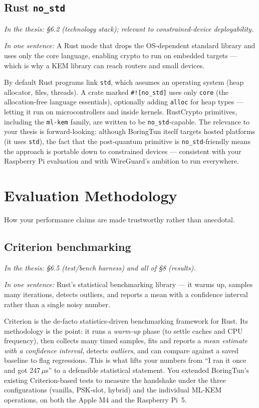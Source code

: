 \documentclass[11pt]{article}
\newcommand{\seethesis}[1]{%
  {\small\color{softgray}\textit{In the thesis: #1}}\par\vspace{3pt}}
\newcommand{\nutshell}[1]{\noindent\textit{In one sentence:} #1\par\vspace{4pt}}
\begin{document}
\subsection{Rust \texttt{no\_std}}
\seethesis{\S6.2 (technology stack); relevant to constrained-device deployability.}
\nutshell{A Rust mode that drops the OS-dependent standard library and uses only
the core language, enabling crypto to run on embedded targets --- which is why a
KEM library can reach routers and small devices.}

By default Rust programs link \texttt{std}, which assumes an operating system
(heap allocator, files, threads). A crate marked \texttt{\#![no\_std]} uses only
\texttt{core} (the allocation-free language essentials), optionally adding
\texttt{alloc} for heap types --- letting it run on microcontrollers and inside
kernels. RustCrypto primitives, including the \texttt{ml-kem} family, are written
to be \texttt{no\_std}-capable. The relevance to your thesis is forward-looking:
although BoringTun itself targets hosted platforms (it uses \texttt{std}), the
fact that the post-quantum primitive is \texttt{no\_std}-friendly means the
approach is portable down to constrained devices --- consistent with your
Raspberry Pi evaluation and with WireGuard's ambition to run everywhere.

\section{Evaluation Methodology}
How your performance claims are made trustworthy rather than anecdotal.

\subsection{Criterion benchmarking}
\seethesis{\S6.5 (test/bench harness) and all of \S8 (results).}
\nutshell{Rust's statistical benchmarking library --- it warms up, samples many
iterations, detects outliers, and reports a mean with a confidence interval
rather than a single noisy number.}

Criterion is the de-facto statistics-driven benchmarking framework for Rust. Its
methodology is the point: it runs a \emph{warm-up} phase (to settle caches and
CPU frequency), then collects many timed samples, fits and reports a \emph{mean
estimate with a confidence interval}, detects \emph{outliers}, and can compare
against a saved baseline to flag regressions. This is what lifts your numbers from
``I ran it once and got 247\,$\mu$s'' to a defensible statistical statement. You
extended BoringTun's existing Criterion-based tests to measure the handshake under
the three configurations (vanilla, PSK-slot, hybrid) and the individual ML-KEM
operations, on both the Apple M4 and the Raspberry Pi~5.
\end{document}
